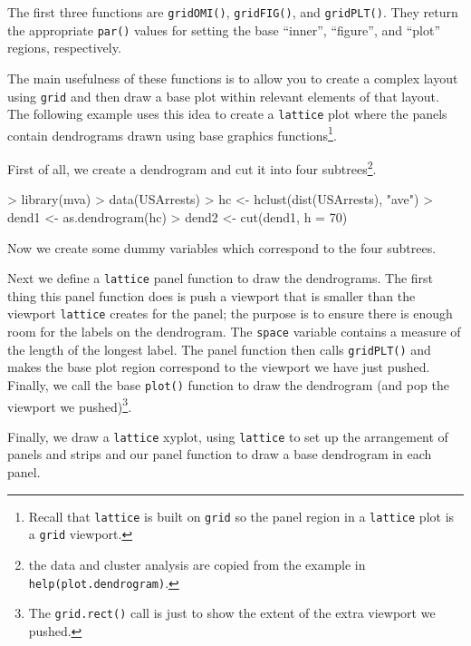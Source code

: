\documentclass[a4paper]{article}
\newcommand{\grid}{{\tt grid}}
\newcommand{\lattice}{{\tt lattice}}
\begin{document}
The first three functions are \verb|gridOMI()|, \verb|gridFIG()|,
and \verb|gridPLT()|.  They return the appropriate
\verb|par()| values for setting the base ``inner'', ``figure'',
and ``plot'' regions, respectively.

The main usefulness of these functions is to allow you to create a
complex layout using \grid{} and then draw a base plot within 
relevant elements of that layout.  The following example
uses this idea to create a \lattice{} plot where the panels contain 
dendrograms drawn using base graphics functions\footnote{Recall
that \lattice{} is built on \grid{} so the panel region in
a \lattice{} plot is a \grid{} viewport.}.

First of all, we create a dendrogram and cut it into four 
subtrees\footnote{the data and cluster analysis are copied from the example
in {\tt help(plot.dendrogram)}.}.

\begin{Schunk}
\begin{Sinput}
> library(mva)
> data(USArrests)
> hc <- hclust(dist(USArrests), "ave")
> dend1 <- as.dendrogram(hc)
> dend2 <- cut(dend1, h = 70)
\end{Sinput}
\end{Schunk}
Now we create some dummy variables which correspond to the four subtrees.

\begin{Schunk}
\end{Schunk}
Next we define a \lattice{} panel function to draw the dendrograms.
The first thing this panel function does is push a viewport
that is smaller than the viewport \lattice{} creates for the panel;
the purpose is to ensure there is enough room for the labels on
the dendrogram.  The \verb|space| variable contains a measure
of the length of the longest label.
The panel function then calls \verb|gridPLT()|
and makes the base plot region correspond to the 
viewport we have just pushed.  Finally, we
call the base \verb|plot()| function to draw the 
dendrogram (and pop the viewport we pushed)\footnote{The {\tt grid.rect()}
call is just to show the extent of the extra viewport we pushed.}.

\begin{Schunk}
\end{Schunk}
Finally, we draw a \lattice{} xyplot, using \lattice{} to set up the
arrangement of panels and strips and our panel function to draw
a base dendrogram in each panel.
\end{document}
